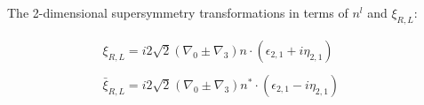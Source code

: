 \documentclass{letter}
\begin{document}
The 2-dimensional supersymmetry transformations in terms of $n^l$ and $\xi_{R,
L}$:


\begin{eqnarray*}
  \xi_{R, L} = i 2 \sqrt{2} (\nabla_0 \pm \nabla_3) n \cdot (\epsilon_{2, 1} +
  i \eta_{2, 1}) &  & \\
  &  & \\
  \bar{\xi}_{R, L} = i 2 \sqrt{2} ^{} (\nabla_0 \pm \nabla_3) n^{\ast} \cdot
  (\epsilon_{2, 1} - i \eta_{2, 1}) &  & 
\end{eqnarray*}
\end{document}
